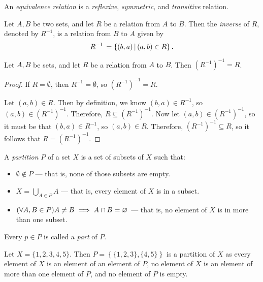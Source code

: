 \begin{defn}\label{equivalence-relation}
    An \emph{equivalence relation} is a \emph{reflexive}, \emph{symmetric}, and \emph{transitive} relation.
\end{defn}

\begin{defn}
    Let $A, B$ be two sets, and let $R$ be a relation from $A$ to $B$. Then the \emph{inverse} of $R$, denoted by $R^{-1}$, is a relation from $B$ to $A$ given by \[R^{-1} \,= \left\{(b, a) \,\middle|\, (a, b) \in R \right\}.\]
\end{defn}

\begin{prop}
    Let $A, B$ be sets, and let $R$ be a relation from $A$ to $B$. Then $\left(R^{-1}\right)^{-1} = R$.
\end{prop}

\begin{proof}
    If $R = \emptyset$, then $R^{-1} = \emptyset$, so $\left(R^{-1}\right)^{-1} = R$.

    Let $(a, b) \in R$. Then by definition, we know $(b, a) \in R^{-1}$, so $(a, b) \in \left(R^{-1}\right)^{-1}$. Therefore, $R \subseteq \left(R^{-1}\right)^{-1}$. Now let $(a, b) \in \left(R^{-1}\right)^{-1}$, so it must be that $(b, a) \in R^{-1}$, so $(a, b) \in R$. Therefore, $\left(R^{-1}\right)^{-1} \subseteq R$, so it follows that $R = \left(R^{-1}\right)^{-1}$.
\end{proof}

\begin{defn}\label{partition}
    A \emph{partition} $P$ of a set $X$ is a set of subsets of $X$ such that:
    \begin{itemize}
        \item $\emptyset \notin P$ --- that is, none of those subsets are empty.
        \item $X = \bigcup_{A\in P}A$ --- that is, every element of $X$ is in a subset.
        \item $(\forall A, B \in P) A \neq B \implies A \cap B = \varnothing$ --- that is, no element of $X$ is in more than one subset.
    \end{itemize}
    Every $p \in P$ is called a \emph{part} of $P$.
\end{defn}

\begin{exmp}
    Let $X = \{1, 2, 3, 4, 5\}$. Then $P = \left\{\{1, 2, 3\}, \{4, 5\}\right\}$ is a partition of $X$ as every element of $X$ is an element of an element of $P$, no element of $X$ is an element of more than one element of $P$, and no element of $P$ is empty.
\end{exmp}

